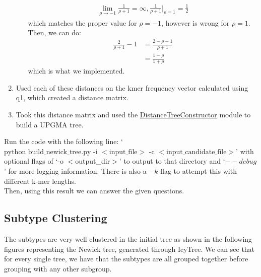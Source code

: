 \documentclass[10pt]{article}
\begin{document}
\begin{enumerate}
\begin{itemize}
    \begin{align*}
      \lim_{\rho \rightarrow -1}\frac{1}{\rho + 1} = \infty, \frac{1}{\rho + 1}|_{\rho = 1} = \frac{1}{2}
    \end{align*}
    which matches the proper value for $\rho = -1$, however is wrong for $\rho = 1$. Then, we can do:
    \begin{align*}
      \frac{2}{\rho + 1} - 1 &= \frac{2 - \rho - 1}{\rho + 1}\\
      &= \frac{1 - \rho}{1 + \rho}
    \end{align*}
    which is what we implemented.
  \end{itemize}
  \item Used each of these distances on the kmer frequency vector calculated using q1, which created a distance matrix.
  \item Took this distance matrix and used the \href{https://biopython.org/docs/dev/api/Bio.Phylo.TreeConstruction.html#Bio.Phylo.TreeConstruction.DistanceTreeConstructor}{DistanceTreeConstructor} module to build a UPGMA tree.
\end{enumerate}
Run the code with the following line: `$\text{python build\_newick\_tree.py -i }<\text{input\_file}>\text{ -c }<\text{input\_candidate\_file}>$' with optional flags of `-o $<$output\_dir$>$' to output to that directory and `$--debug$' for more logging information. There is also a $-k$ flag to attempt this with different k-mer lengths.\\

Then, using this result we can answer the given questions.

\subsection*{Subtype Clustering}
The subtypes are very well clustered in the initial tree as shown in the following figures representing the Newick tree, generated through IcyTree. We can see that for every single tree, we have that the subtypes are all grouped together before grouping with any other subgroup.
\end{document}

